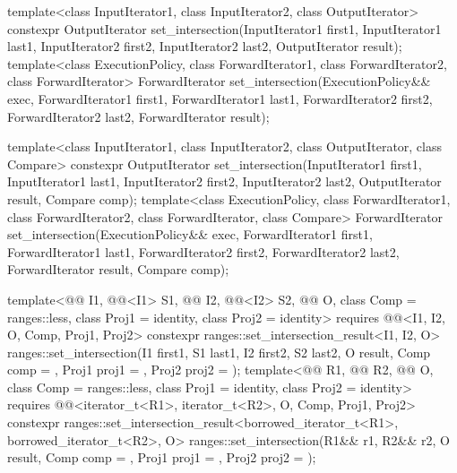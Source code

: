 %
\begin{itemdecl}
template<class InputIterator1, class InputIterator2,
         class OutputIterator>
  constexpr OutputIterator
    set_intersection(InputIterator1 first1, InputIterator1 last1,
                     InputIterator2 first2, InputIterator2 last2,
                     OutputIterator result);
template<class ExecutionPolicy, class ForwardIterator1, class ForwardIterator2,
         class ForwardIterator>
  ForwardIterator
    set_intersection(ExecutionPolicy&& exec,
                     ForwardIterator1 first1, ForwardIterator1 last1,
                     ForwardIterator2 first2, ForwardIterator2 last2,
                     ForwardIterator result);

template<class InputIterator1, class InputIterator2,
         class OutputIterator, class Compare>
  constexpr OutputIterator
    set_intersection(InputIterator1 first1, InputIterator1 last1,
                     InputIterator2 first2, InputIterator2 last2,
                     OutputIterator result, Compare comp);
template<class ExecutionPolicy, class ForwardIterator1, class ForwardIterator2,
         class ForwardIterator, class Compare>
  ForwardIterator
    set_intersection(ExecutionPolicy&& exec,
                     ForwardIterator1 first1, ForwardIterator1 last1,
                     ForwardIterator2 first2, ForwardIterator2 last2,
                     ForwardIterator result, Compare comp);

template<@@ I1, @@<I1> S1, @@ I2, @@<I2> S2,
         @@ O, class Comp = ranges::less,
         class Proj1 = identity, class Proj2 = identity>
  requires @@<I1, I2, O, Comp, Proj1, Proj2>
  constexpr ranges::set_intersection_result<I1, I2, O>
    ranges::set_intersection(I1 first1, S1 last1, I2 first2, S2 last2, O result,
                             Comp comp = {}, Proj1 proj1 = {}, Proj2 proj2 = {});
template<@@ R1, @@ R2, @@ O,
         class Comp = ranges::less, class Proj1 = identity, class Proj2 = identity>
  requires @@<iterator_t<R1>, iterator_t<R2>, O, Comp, Proj1, Proj2>
  constexpr ranges::set_intersection_result<borrowed_iterator_t<R1>, borrowed_iterator_t<R2>, O>
    ranges::set_intersection(R1&& r1, R2&& r2, O result,
                             Comp comp = {}, Proj1 proj1 = {}, Proj2 proj2 = {});
\end{itemdecl}


